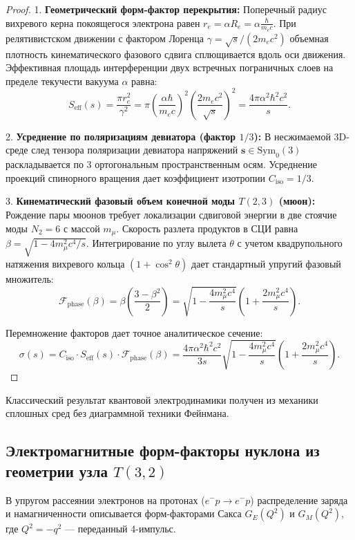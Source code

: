 \documentclass[12pt,a4paper]{article}
\begin{document}
	\begin{proof}
		1. \textbf{Геометрический форм-фактор перекрытия:}
		Поперечный радиус вихревого керна покоящегося электрона равен $r_e = \alpha R_e = \alpha \frac{\hbar}{m_e c}$. При релятивистском движении с фактором Лоренца $\gamma = \sqrt{s} / (2 m_e c^2)$ объемная плотность кинематического фазового сдвига сплющивается вдоль оси движения. Эффективная площадь интерференции двух встречных пограничных слоев на пределе текучести вакуума $\alpha$ равна:
		\begin{equation}
			S_{\text{eff}}(s) = \frac{\pi r_e^2}{\gamma^2} = \pi \left( \frac{\alpha \hbar}{m_e c} \right)^2 \left( \frac{2 m_e c^2}{\sqrt{s}} \right)^2 = \frac{4\pi \alpha^2 \hbar^2 c^2}{s}.
		\end{equation}
		
		2. \textbf{Усреднение по поляризациям девиатора (фактор $1/3$):}
		В несжимаемой 3D-среде след тензора поляризации девиатора напряжений $\mathbf{s} \in \mathrm{Sym}_0(3)$ раскладывается по 3 ортогональным пространственным осям. Усреднение проекций спинорного вращения дает коэффициент изотропии $C_{\text{iso}} = 1/3$.
		
		3. \textbf{Кинематический фазовый объем конечной моды $T(2,3)$ (мюон):}
		Рождение пары мюонов требует локализации сдвиговой энергии в две стоячие моды $N_2 = 6$ с массой $m_\mu$. Скорость разлета продуктов в СЦИ равна $\beta = \sqrt{1 - 4m_\mu^2 c^4 / s}$. Интегрирование по углу вылета $\theta$ с учетом квадрупольного натяжения вихревого кольца $(1 + \cos^2\theta)$ дает стандартный упругий фазовый множитель:
		\begin{equation}
			\mathcal{F}_{\text{phase}}(\beta) = \beta \left( \frac{3 - \beta^2}{2} \right) = \sqrt{1 - \frac{4m_\mu^2 c^4}{s}} \left( 1 + \frac{2m_\mu^2 c^4}{s} \right).
		\end{equation}
		
		Перемножение факторов дает точное аналитическое сечение:
		\begin{equation}
			\sigma(s) = C_{\text{iso}} \cdot S_{\text{eff}}(s) \cdot \mathcal{F}_{\text{phase}}(\beta) = \frac{4\pi \alpha^2 \hbar^2 c^2}{3s} \sqrt{1 - \frac{4m_\mu^2 c^4}{s}} \left( 1 + \frac{2m_\mu^2 c^4}{s} \right).
		\end{equation}
	\end{proof}
	Классический результат квантовой электродинамики получен из механики сплошных сред без диаграммной техники Фейнмана.
	
	\subsection{Электромагнитные форм-факторы нуклона из геометрии узла $T(3,2)$}
	В упругом рассеянии электронов на протонах ($e^- p \to e^- p$) распределение заряда и намагниченности описывается форм-факторами Сакса $G_E(Q^2)$ и $G_M(Q^2)$, где $Q^2 = -q^2$ --- переданный 4-импульс.
	
\end{document}
